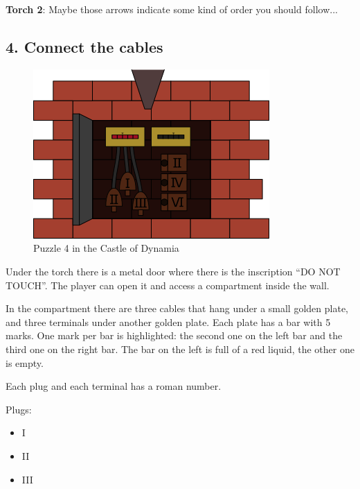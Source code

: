 \textbf{Torch 2}: Maybe those arrows indicate some kind of order you should follow...



\subsection{4. Connect the cables}

\begin{figure}[H]
  \centering
  \includegraphics[width=\textwidth]{Images/Puzzles/castleOfDynamia4}
  \caption{Puzzle 4 in the Castle of Dynamia}
\end{figure}


Under the torch there is a metal door where there is the inscription \enquote{DO NOT TOUCH}. The player can open it and access a compartment inside the wall.

In the compartment there are three cables that hang under a small golden plate, and three terminals under another golden plate. Each plate has a bar with 5 marks. One mark per bar is highlighted: the second one on the left bar and the third one on the right bar. The bar on the left is full of a red liquid, the other one is empty.

Each plug and each terminal has a roman number.

Plugs:
\begin{itemize}
	\item I
	\item II
	\item III
\end{itemize}

